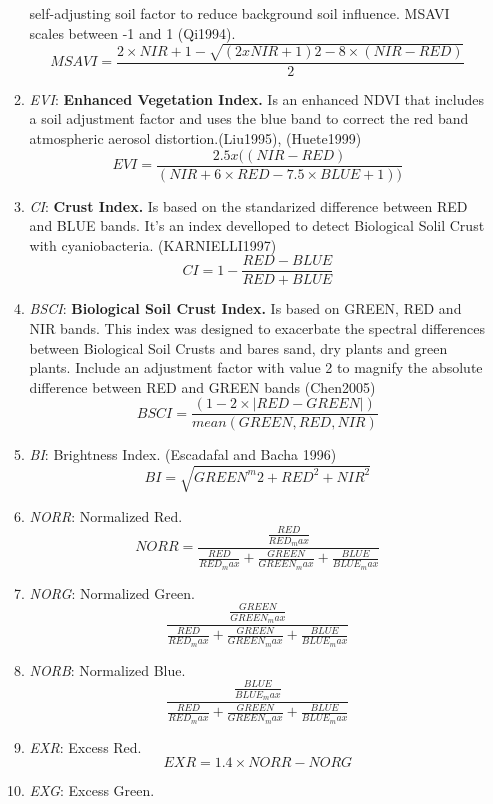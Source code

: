 \documentclass[
]{article}
\begin{document}
\begin{itemize}
\begin{enumerate}
        self-adjusting soil factor to reduce background soil influence. MSAVI scales between 
        -1 and 1 (Qi1994). 
        \[
        MSAVI = \frac{2\times NIR + 1 - \sqrt{(2 x NIR + 1)2 - 8 \times (NIR -RED)}}{2}
    	\]
        \item \emph{EVI}:  \textbf{Enhanced Vegetation Index.} Is an enhanced NDVI that 
        includes a soil adjustment factor and  uses the blue band to correct the  red  band  
        atmospheric aerosol distortion.(Liu1995), (Huete1999)        
          \[
          EVI = \frac{2.5 x ((NIR - RED) }{(NIR + 6 \times RED - 7.5 \times BLUE + 1))} 
          \]
        \item \emph{CI}: \textbf{Crust Index.} Is based on the standarized difference between  
        RED and BLUE bands. It's an index develloped to detect Biological Solil Crust with 
        cyaniobacteria. (KARNIELLI1997)
         \[
         CI = 1 - \frac{RED - BLUE}{RED + BLUE} 
         \]
        \item \emph{BSCI}: \textbf{Biological Soil Crust Index.} Is based on GREEN, RED and 
        NIR bands. This index was designed to exacerbate the spectral differences between 
        Biological Soil Crusts and bares sand, dry plants and green plants. Include an 
        adjustment factor with value 2 to magnify the absolute difference between RED and 
        GREEN bands (Chen2005)
         \[
         BSCI = \frac{(1 - 2 \times |RED - GREEN|)}{mean(GREEN, RED, NIR)}   
         \]
\item \emph{BI}: Brightness Index. (Escadafal and Bacha 1996)
         \[
        BI = \sqrt{GREEN^m2 + RED^2 + NIR^2}
         \] 
        \item \emph{NORR}: Normalized Red.
          \[
          NORR = \frac{\frac{RED}{RED_max}}{\frac{RED}{RED_max}+\frac{GREEN}{GREEN_max}+
          \frac{BLUE}{BLUE_max}}
          \]
        \item \emph{NORG}: Normalized Green. 
          \[
          \frac{\frac{GREEN}{GREEN_max}}{\frac{RED}{RED_max}+\frac{GREEN}{GREEN_max}+
          \frac{BLUE}{BLUE_max}}
          \]
        \item \emph{NORB}: Normalized Blue.
          \[
          \frac{\frac{BLUE}{BLUE_max}}{\frac{RED}{RED_max}+\frac{GREEN}{GREEN_max}+
          \frac{BLUE}{BLUE_max}}
          \]
        \item \emph{EXR}: Excess Red.
        \[
        EXR = 1.4 \times NORR - NORG
        \]
        \item \emph{EXG}:  Excess Green.
        \[        
\]
\end{enumerate}
\end{itemize}
\end{document}
